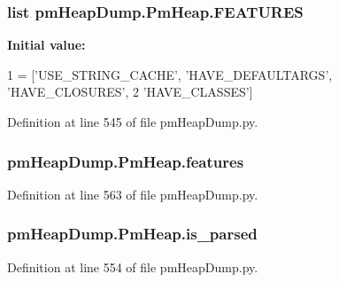 \hypertarget{classpm_heap_dump_1_1_pm_heap_a7f10bb7ecf23d67332c5b090b6ca58f1}{
\subsubsection[{F\-E\-A\-T\-U\-R\-E\-S}]{\setlength{\rightskip}{0pt plus 5cm}list pm\-Heap\-Dump.\-Pm\-Heap.\-F\-E\-A\-T\-U\-R\-E\-S\hspace{0.3cm}{\ttfamily [static]}}}\label{classpm_heap_dump_1_1_pm_heap_a7f10bb7ecf23d67332c5b090b6ca58f1}
{\bfseries Initial value\-:}
\begin{DoxyCode}
1 = [\textcolor{stringliteral}{'USE\_STRING\_CACHE'}, \textcolor{stringliteral}{'HAVE\_DEFAULTARGS'}, \textcolor{stringliteral}{'HAVE\_CLOSURES'},
2                 \textcolor{stringliteral}{'HAVE\_CLASSES'}]
\end{DoxyCode}


Definition at line 545 of file pm\-Heap\-Dump.\-py.

\hypertarget{classpm_heap_dump_1_1_pm_heap_a4252c452a05434c47cb8b24d99a1f642}{
\subsubsection[{features}]{\setlength{\rightskip}{0pt plus 5cm}pm\-Heap\-Dump.\-Pm\-Heap.\-features}}\label{classpm_heap_dump_1_1_pm_heap_a4252c452a05434c47cb8b24d99a1f642}


Definition at line 563 of file pm\-Heap\-Dump.\-py.

\hypertarget{classpm_heap_dump_1_1_pm_heap_a5eb881fccaa694956ede34deb4cd785c}{
\subsubsection[{is\-\_\-parsed}]{\setlength{\rightskip}{0pt plus 5cm}pm\-Heap\-Dump.\-Pm\-Heap.\-is\-\_\-parsed}}\label{classpm_heap_dump_1_1_pm_heap_a5eb881fccaa694956ede34deb4cd785c}


Definition at line 554 of file pm\-Heap\-Dump.\-py.

